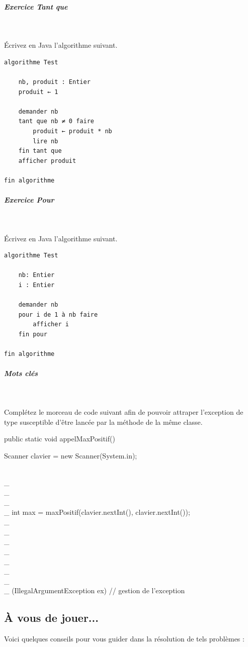 \documentclass[11pt,a4paper]{article}
\begin{document}
		\subparagraph{Exercice Tant que} 
		
					\textcolor{white}{.} \par
				
					\'Ecrivez en Java l'algorithme suivant.
				
            \par
        \begin{verbatim}
algorithme Test

    nb, produit : Entier
    produit ← 1 

    demander nb
    tant que nb ≠ 0 faire
        produit ← produit * nb
        lire nb 
    fin tant que
    afficher produit
    
fin algorithme
			    \end{verbatim}
			
		\subparagraph{Exercice Pour} 
		
					\textcolor{white}{.} \par
				
					\'Ecrivez en Java l'algorithme suivant.
				
            \par
        \begin{verbatim}
algorithme Test

    nb: Entier
    i : Entier

    demander nb
    pour i de 1 à nb faire
        afficher i
    fin pour

fin algorithme
			     \end{verbatim}
			
		\subparagraph{Mots cl\'es} 
		
                \textcolor{white}{.} \par
            
							Compl\'etez le morceau de code suivant afin de pouvoir attraper l'exception de type \verb@IllegalArgumentException@ 
							susceptible d'\^etre lanc\'ee par la m\'ethode \verb@maxPositif@ de la m\^eme classe.
						\clearpage\begin{Java}
public static void appelMaxPositif() {

    Scanner clavier = new Scanner(System.in);
    
     \\_\\_\\_\\_  {
        int max = maxPositif(clavier.nextInt(), clavier.nextInt());
    }  \\_\\_\\_\\_\\_\\_\\_\\_  (IllegalArgumentException ex) {
        // gestion de l'exception
    }
    
}
							\end{Java}\subsection{\`A vous de jouer...}
          Voici quelques conseils pour vous guider dans la r\'esolution de tels probl\`emes :
          
\end{document}
